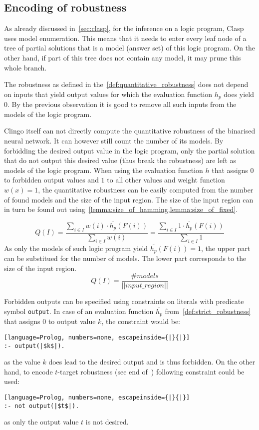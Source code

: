 \subsection{Encoding of robustness}

As already discussed in~\cref{sec:clasp}, for the inference on a logic program,
Clasp uses model enumeration. This means that it needs to enter every leaf node
of a tree of partial solutions that is a model (answer set) of this logic program.
On the other hand, if part of this tree does not contain any model, it may prune
this whole branch.

The robustness as defined in the~\cref{def:quantitative_robustness}
does not depend on inputs that yield output values for which the evaluation function
$h_p$ does yield 0. By the previous observation it is good to remove all such inputs
from the models of the logic program.

Clingo itself can not directly compute the quantitative robustness of the binarised
neural network. It can however still count the number of its models.
By forbidding the desired output value in the logic program,
only the partial solution that do not output this desired value
(thus break the robustness) are left as models of the logic program.
When using the evaluation function $h$ that assigns $0$ to forbidden output values
and $1$ to all other values and weight function $w(x) = 1$,
the quantitative robustness can be easily computed from the number of found models
and the size of the input region. The size of the input region can in turn
be found out using~\cref{lemma:size_of_hamming,lemma:size_of_fixed}.

\[Q(I) = \frac{\sum_{i\in I} w(i)\cdot \overline{h_p}(F(i))}{\sum_{i\in I} w(i)}
    = \frac{\sum_{i\in I} 1\cdot \overline{h_p}(F(i))}{\sum_{i\in I} 1}\]
As only the models of such logic program yield $\overline{h_p}(F(i)) = 1$,
the upper part can be substitued for the number of models. The lower part corresponds
to the size of the input region.
\[Q(I) = \frac{\#models}{||input\_region||}\]

Forbidden outputs can be specified using constraints on literals
with predicate symbol \texttt{output}.
In case of an evaluation function $\overline{h_p}$ from~\cref{def:strict_robustness}
that assigns $0$ to output value $k$, the constraint would be:
\begin{lstlisting}[language=Prolog, numbers=none, escapeinside={|}{|}]
:- output(|$k$|).
\end{lstlisting}
as the value $k$ does lead to the desired output and is thus forbidden. On the other hand,
to encode $t$-target robustness (see end of~)
following constraint could be used:
\begin{lstlisting}[language=Prolog, numbers=none, escapeinside={|}{|}]
:- not output(|$t$|).
\end{lstlisting}
as only the output value $t$ is not desired.
